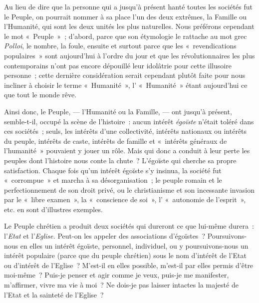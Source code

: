 \documentclass[french,twoside]{book} %
\begin{document}
Au lieu de dire que la personne qui a jusqu’à présent hanté toutes les sociétés fut le Peuple, on pourrait nommer à sa place l’un des deux extrêmes, la Famille ou l’Humanité, qui sont les deux unités les  plus naturelles. Nous préférons cependant le mot « Peuple » ; d’abord, parce que son étymologie le rattache au mot grec \emph{Polloi}, le nombre, la foule, ensuite et surtout parce que les « revendications populaires » sont aujourd’hui à l’ordre du jour et que les révolutionnaires les plus contemporains n’ont pas encore dépouillé leur idolâtrie pour cette illusoire personne ; cette dernière considération serait cependant plutôt faite pour nous incliner à choisir le terme « Humanité », l’ « Humanité » étant aujourd’hui ce que tout le monde rêve.\par
Ainsi donc, le Peuple, — l’Humanité ou la Famille, — ont jusqu’à présent, semble-t-il, occupé la scène de l’histoire : aucun intérêt \emph{égoïste} n’était toléré dans ces sociétés ; seuls, les intérêts d’une collectivité, intérêts nationaux ou intérêts du peuple, intérêts de caste, intérêts de famille et « intérêts généraux de l’humanité » pouvaient y jouer un rôle. Mais qui donc a conduit à leur perte les peuples dont l’histoire nous conte la chute ? L’égoïste qui cherche sa propre satisfaction. Chaque fois qu’un intérêt égoïste s’y insinua, la société fut « corrompue » et marcha à sa désorganisation ; le peuple romain et le perfectionnement de son droit privé, ou le christianisme et son incessante invasion par le « libre examen », la « conscience de soi », l’ « autonomie de l’esprit », etc. en sont d’illustres exemples.\par
Le Peuple chrétien a produit deux sociétés qui dureront ce que lui-même durera : l’\emph{Etat} et l’\emph{Eglise. }Peut-on les appeler des associations d’égoïstes ? Poursuivons-nous en elles un intérêt égoïste, personnel, individuel, ou y poursuivons-nous un intérêt populaire (parce que du peuple chrétien) sous le nom d’intérêt de l’Etat ou d’intérêt de l’Eglise ? M’est-il en elles possible, m’est-il par elles permis d’être moi-même ? Puis-je penser et agir comme je veux, puis-je me manifester, m’affirmer, vivre ma vie à moi ? Ne dois-je pas laisser intactes la majesté de l’Etat et la sainteté de l’Eglise ?\par
\end{document}
